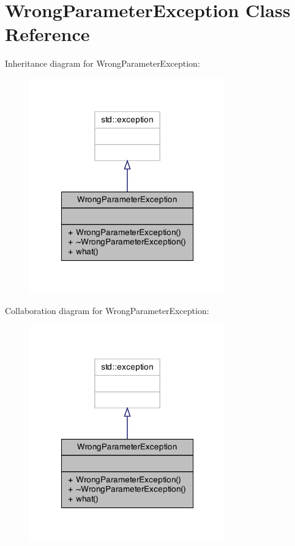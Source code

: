 \hypertarget{class_wrong_parameter_exception}{\section{Wrong\+Parameter\+Exception Class Reference}
\label{class_wrong_parameter_exception}
}


Inheritance diagram for Wrong\+Parameter\+Exception\+:\nopagebreak
\begin{figure}[H]
\begin{center}
\leavevmode
\includegraphics[width=240pt]{class_wrong_parameter_exception__inherit__graph}
\end{center}
\end{figure}


Collaboration diagram for Wrong\+Parameter\+Exception\+:\nopagebreak
\begin{figure}[H]
\begin{center}
\leavevmode
\includegraphics[width=240pt]{class_wrong_parameter_exception__coll__graph}
\end{center}
\end{figure}
